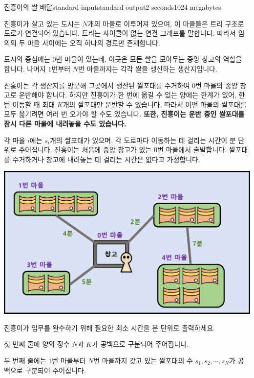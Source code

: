 \begin{problem}{진흥이의 쌀 배달}{standard input}{standard output}{2 seconds}{1024 megabytes}

진흥이가 살고 있는 도시는 $N$개의 마을로 이루어져 있으며, 이 마을들은 트리 구조로 도로가 연결되어 있습니다. 트리는 사이클이 없는 연결 그래프를 말합니다. 따라서 임의의 두 마을 사이에는 오직 하나의 경로만 존재합니다.

도시의 중심에는 $0$번 마을이 있는데, 이곳은 모든 쌀을 모아두는 중앙 창고의 역할을 합니다. 나머지 $1$번부터 $N$번 마을까지는 각각 쌀을 생산하는 생산지입니다.

진흥이는 각 생산지를 방문해 그곳에서 생산된 쌀포대를 수거하여 $0$번 마을의 중앙 창고로 운반해야 합니다. 하지만 진흥이가 한 번에 옮길 수 있는 양에는 한계가 있어, 한 번 이동할 때 최대 $K$개의 쌀포대만 운반할 수 있습니다. 따라서 어떤 마을의 쌀포대를 모두 옮기려면 여러 번 오가야 할 수도 있습니다. \textbf{또한, 진흥이는 운반 중인 쌀포대를 잠시 다른 마을에 내려놓을 수도 있습니다.}

각 마을 $i$에는 $s_i$개의 쌀포대가 있으며, 각 도로마다 이동하는 데 걸리는 시간이 분 단위로 주어집니다. 진흥이는 처음에 중앙 창고가 있는 $0$번 마을에서 출발합니다. 쌀포대를 수거하거나 창고에 내려놓는 데 걸리는 시간은 없다고 가정합니다.

\begin{center}
\includegraphics{town.png}
\end{center}

진흥이가 임무를 완수하기 위해 필요한 최소 시간을 분 단위로 출력하세요.

\InputFile
첫 번째 줄에 양의 정수 $N$과 $K$가 공백으로 구분되어 주어집니다.

두 번째 줄에는 $1$번 마을부터 $N$번 마을까지 갖고 있는 쌀포대의 수 $s_{1}, s_{2}, \cdots, s_{N}$가 공백으로 구분되어 주어집니다.


\end{problem}
